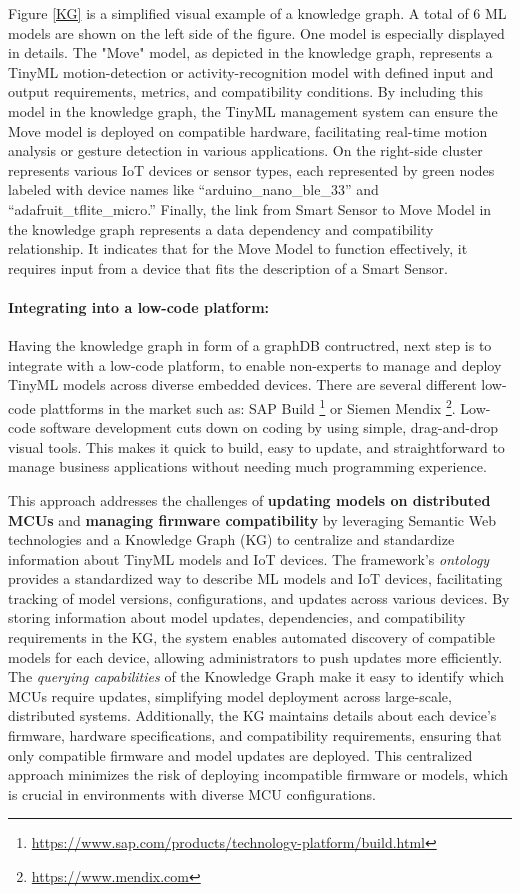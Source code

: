 \documentclass[twocolumn]{article}
\begin{document}
Figure \ref{KG} is a simplified visual example of a knowledge graph. A total of 6 ML models are shown on the left side of the figure. One model is especially displayed in details. The "Move" model, as depicted in the knowledge graph, represents a TinyML motion-detection or activity-recognition model with defined input and output requirements, metrics, and compatibility conditions. By including this model in the knowledge graph, the TinyML management system can ensure the Move model is deployed on compatible hardware, facilitating real-time motion analysis or gesture detection in various applications. On the right-side cluster represents various IoT devices or sensor types, each represented by green nodes labeled with device names like “arduino\_nano\_ble\_33” and “adafruit\_tflite\_micro.” Finally, the link from Smart Sensor to Move Model in the knowledge graph represents a data dependency and compatibility relationship. It indicates that for the Move Model to function effectively, it requires input from a device that fits the description of a Smart Sensor.

\paragraph{Integrating into a low-code platform:}
Having the knowledge graph in form of a graphDB contructred, next step is to integrate with a low-code platform, to enable non-experts to manage and deploy TinyML models across diverse embedded devices. There are several different low-code plattforms in the market such as: SAP Build \footnote{\url{https://www.sap.com/products/technology-platform/build.html}} or Siemen Mendix \footnote{\url{https://www.mendix.com}}. Low-code software development cuts down on coding by using simple, drag-and-drop visual tools. This makes it quick to build, easy to update, and straightforward to manage business applications without needing much programming experience.



This approach addresses the challenges of \textbf{updating models on distributed MCUs} and \textbf{managing firmware compatibility} by leveraging Semantic Web technologies and a Knowledge Graph (KG) to centralize and standardize information about TinyML models and IoT devices. The framework’s \textit{ontology} provides a standardized way to describe ML models and IoT devices, facilitating tracking of model versions, configurations, and updates across various devices. By storing information about model updates, dependencies, and compatibility requirements in the KG, the system enables automated discovery of compatible models for each device, allowing administrators to push updates more efficiently. The \textit{querying capabilities} of the Knowledge Graph make it easy to identify which MCUs require updates, simplifying model deployment across large-scale, distributed systems. Additionally, the KG maintains details about each device’s firmware, hardware specifications, and compatibility requirements, ensuring that only compatible firmware and model updates are deployed. This centralized approach minimizes the risk of deploying incompatible firmware or models, which is crucial in environments with diverse MCU configurations. 
\end{document}
